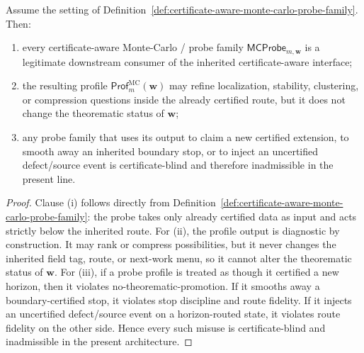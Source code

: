 \begin{proposition}
\label{prop:certificate-aware-monte-carlo-probes-have-diagnostic-force-but-no-theorematic-authority}
Assume the setting of Definition~\ref{def:certificate-aware-monte-carlo-probe-family}. Then:
\begin{enumerate}[label=(\roman*)]
 \item every certificate-aware Monte-Carlo / probe family \(\mathsf{MCProbe}_{m,\mathbf w}\) is a legitimate downstream consumer of the inherited certificate-aware interface;
 \item the resulting profile \(\mathsf{Prof}^{\mathrm{MC}}_{m}(\mathbf w)\) may refine localization, stability, clustering, or compression questions inside the already certified route, but it does not change the theorematic status of \(\mathbf w\);
 \item any probe family that uses its output to claim a new certified extension, to smooth away an inherited boundary stop, or to inject an uncertified defect/source event is certificate-blind and therefore inadmissible in the present line.
\end{enumerate}
\end{proposition}

\begin{proof}
Clause (i) follows directly from Definition~\ref{def:certificate-aware-monte-carlo-probe-family}: the probe takes only already certified data as input and acts strictly below the inherited route. For (ii), the profile output is diagnostic by construction. It may rank or compress possibilities, but it never changes the inherited field tag, route, or next-work menu, so it cannot alter the theorematic status of \(\mathbf w\). For (iii), if a probe profile is treated as though it certified a new horizon, then it violates no-theorematic-promotion. If it smooths away a boundary-certified stop, it violates stop discipline and route fidelity. If it injects an uncertified defect/source event on a horizon-routed state, it violates route fidelity on the other side. Hence every such misuse is certificate-blind and inadmissible in the present architecture.
\end{proof}

